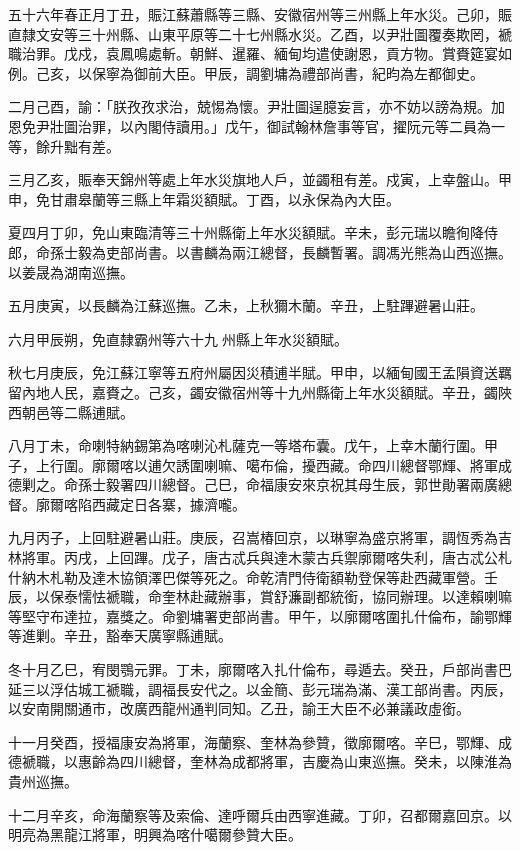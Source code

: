 \begin{pinyinscope}
五十六年春正月丁丑，賑江蘇蕭縣等三縣、安徽宿州等三州縣上年水災。己卯，賑直隸文安等三十州縣、山東平原等二十七州縣水災。乙酉，以尹壯圖覆奏欺罔，褫職治罪。戊戍，袁鳳鳴處斬。朝鮮、暹羅、緬甸均遣使謝恩，貢方物。賞賚筵宴如例。己亥，以保寧為御前大臣。甲辰，調劉墉為禮部尚書，紀昀為左都御史。

二月己酉，諭：「朕孜孜求治，兢惕為懷。尹壯圖逞臆妄言，亦不妨以謗為規。加恩免尹壯圖治罪，以內閣侍讀用。」戊午，御試翰林詹事等官，擢阮元等二員為一等，餘升黜有差。

三月乙亥，賑奉天錦州等處上年水災旗地人戶，並蠲租有差。戍寅，上幸盤山。甲申，免甘肅皋蘭等三縣上年霜災額賦。丁酉，以永保為內大臣。

夏四月丁卯，免山東臨清等三十州縣衛上年水災額賦。辛未，彭元瑞以瞻徇降侍郎，命孫士毅為吏部尚書。以書麟為兩江總督，長麟暫署。調馮光熊為山西巡撫。以姜晟為湖南巡撫。

五月庚寅，以長麟為江蘇巡撫。乙未，上秋獮木蘭。辛丑，上駐蹕避暑山莊。

六月甲辰朔，免直隸霸州等六十九州縣上年水災額賦。

秋七月庚辰，免江蘇江寧等五府州屬因災積逋半賦。甲申，以緬甸國王孟隕資送羈留內地人民，嘉賚之。己亥，蠲安徽宿州等十九州縣衛上年水災額賦。辛丑，蠲陜西朝邑等二縣逋賦。

八月丁未，命喇特納錫第為喀喇沁札薩克一等塔布囊。戊午，上幸木蘭行圍。甲子，上行圍。廓爾喀以逋欠誘圍喇嘛、噶布倫，擾西藏。命四川總督鄂輝、將軍成德剿之。命孫士毅署四川總督。己巳，命福康安來京祝其母生辰，郭世勛署兩廣總督。廓爾喀陷西藏定日各寨，據濟嚨。

九月丙子，上回駐避暑山莊。庚辰，召嵩椿回京，以琳寧為盛京將軍，調恆秀為吉林將軍。丙戌，上回蹕。戊子，唐古忒兵與達木蒙古兵禦廓爾喀失利，唐古忒公札什納木札勒及達木協領澤巴傑等死之。命乾清門侍衛額勒登保等赴西藏軍營。壬辰，以保泰懦怯褫職，命奎林赴藏辦事，賞舒濂副都統銜，協同辦理。以達賴喇嘛等堅守布達拉，嘉獎之。命劉墉署吏部尚書。甲午，以廓爾喀圍扎什倫布，諭鄂輝等進剿。辛丑，豁奉天廣寧縣逋賦。

冬十月乙巳，宥閔鶚元罪。丁未，廓爾喀入扎什倫布，尋遁去。癸丑，戶部尚書巴延三以浮估城工褫職，調福長安代之。以金簡、彭元瑞為滿、漢工部尚書。丙辰，以安南開關通巿，改廣西龍州通判同知。乙丑，諭王大臣不必兼議政虛銜。

十一月癸酉，授福康安為將軍，海蘭察、奎林為參贊，徵廓爾喀。辛巳，鄂輝、成德褫職，以惠齡為四川總督，奎林為成都將軍，吉慶為山東巡撫。癸未，以陳淮為貴州巡撫。

十二月辛亥，命海蘭察等及索倫、達呼爾兵由西寧進藏。丁卯，召都爾嘉回京。以明亮為黑龍江將軍，明興為喀什噶爾參贊大臣。


\end{pinyinscope}
